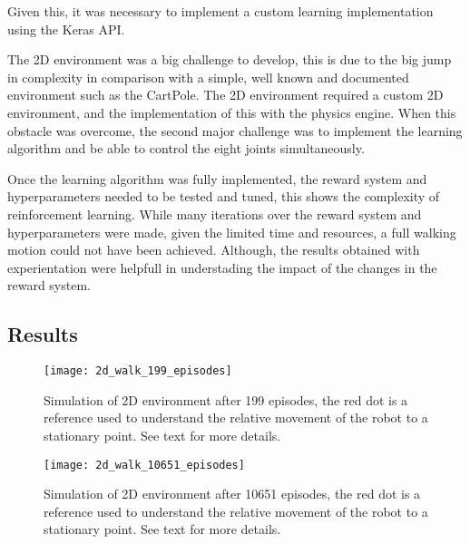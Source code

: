 Given this, it was necessary to implement a custom learning implementation using the Keras API.

The 2D environment was a big challenge to develop, this is due to the big jump in complexity in comparison with a simple, well known and documented environment such as the CartPole.
The 2D environment required a custom 2D environment, and the implementation of this with the physics engine. When this obstacle was overcome, the second major challenge was to implement the learning algorithm
and be able to control the eight joints simultaneously.

Once the learning algorithm was fully implemented, the reward system and hyperparameters needed to be tested and tuned, this shows the complexity of reinforcement learning. While many iterations over the reward system and hyperparameters were made, given the limited time and resources, a full walking motion could not have been achieved.
Although, the results obtained with experientation were helpfull in understading the impact of the changes in the reward system.
\subsection*{Results}
\begin{figure}[H]
 \centering
 \texttt{[image: 2d\_walk\_199\_episodes]}
 \caption{Simulation of 2D environment after 199 episodes, the red dot is a reference used to understand the relative movement of the robot to a stationary point. See text for more details.}
\end{figure}
\begin{figure}[H]
 \centering
 \texttt{[image: 2d\_walk\_10651\_episodes]}
 \caption{Simulation of 2D environment after 10651 episodes, the red dot is a reference used to understand the relative movement of the robot to a stationary point. See text for more details.}
\end{figure}

